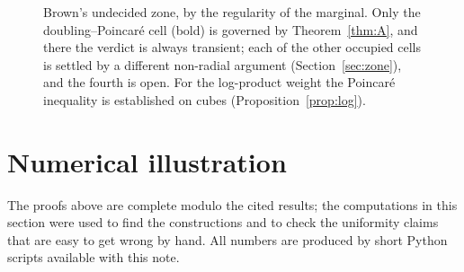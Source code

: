 \documentclass[11pt]{amsart}
\theoremstyle{plain}
\theoremstyle{definition}
\theoremstyle{remark}
\begin{document}
\begin{figure}[t]
\centering
{}
\caption{Brown's undecided zone, by the regularity of the marginal. Only the
doubling--Poincar\'e cell (bold) is governed by Theorem~\ref{thm:A}, and there
the verdict is always transient; each of the other occupied cells is settled by
a different non-radial argument (Section~\ref{sec:zone}), and the fourth is
open. For the log-product weight the Poincar\'e inequality is established on
cubes (Proposition~\ref{prop:log}).}
\label{fig:zonemap}
\end{figure}

\section{Numerical illustration}\label{sec:numerics}

The proofs above are complete modulo the cited results; the computations in
this section were used to find the constructions and to check the uniformity
claims that are easy to get wrong by hand. All numbers are produced by short Python
scripts available with this note.
\end{document}

